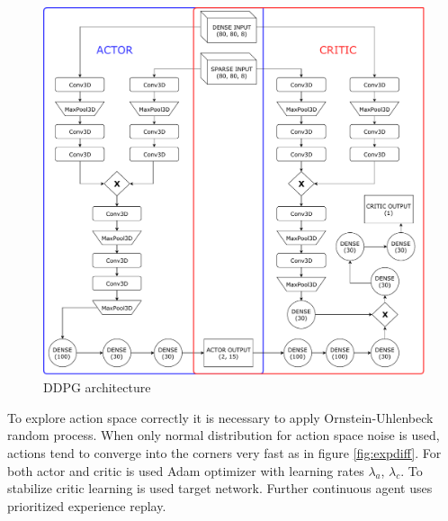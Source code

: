 \begin{figure}[!h]
\centering
\includegraphics[scale=0.55]{fig/ddpg.pdf}
\caption{DDPG architecture}
\label{fig:ddpg}
\end{figure}

\pagebreak
To explore action space correctly it is necessary to apply Ornstein-Uhlenbeck random process. When only normal distribution for action space noise is used, actions tend to converge into the corners very fast as in figure \ref{fig:expdiff}. For both actor and critic is used Adam optimizer with learning rates $\lambda_{a}$, $\lambda_{c}$. To stabilize critic learning is used target network. Further continuous agent uses prioritized experience replay.

